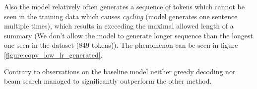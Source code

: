 Also the model relatively often generates a sequence of tokens which cannot be seen in the training data which causes \emph{cycling} (model generates one sentence multiple times), which results in exceeding the maximal allowed length of a summary (We don't allow the model to generate longer sequence than the longest one seen in the dataset (849 tokens)). The phenomenon can be seen in figure \ref{figure:copy_low_lr_generated}.

Contrary to observations on the baseline model neither greedy decoding nor beam search managed to significantly outperform the other method.

\begin{table}[h]
    \centering
    \caption{Performance metrics on the joint-copy models.} \label{table:metrics_copy_low_lr}
\end{table}

